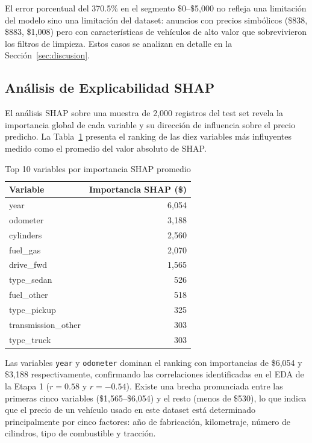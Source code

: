 \documentclass[conference]{IEEEtran}
\begin{document}
El error porcentual del 370.5\% en el segmento \$0–\$5{,}000 no refleja una limitación del modelo sino una limitación del dataset: anuncios con precios simbólicos (\$838, \$883, \$1{,}008) pero con características de vehículos de alto valor que sobrevivieron los filtros de limpieza. Estos casos se analizan en detalle en la Sección~\ref{sec:discusion}.

\subsection{Análisis de Explicabilidad SHAP}
\label{subsec:res_shap}

El análisis SHAP sobre una muestra de 2{,}000 registros del test set revela la importancia global de cada variable y su dirección de influencia sobre el precio predicho. La Tabla~\ref{tab:shap} presenta el ranking de las diez variables más influyentes medido como el promedio del valor absoluto de SHAP.

\begin{table}[H]
    \centering
    \caption{Top 10 variables por importancia SHAP promedio}
    \label{tab:shap}
    \begin{tabular}{lr}
        \toprule
        \textbf{Variable} & \textbf{Importancia SHAP (\$)} \\
        \midrule
        year              & 6{,}054 \\
        odometer          & 3{,}188 \\
        cylinders         & 2{,}560 \\
        fuel\_gas         & 2{,}070 \\
        drive\_fwd        & 1{,}565 \\
        type\_sedan       & 526     \\
        fuel\_other       & 518     \\
        type\_pickup      & 325     \\
        transmission\_other & 303   \\
        type\_truck       & 303     \\
        \bottomrule
    \end{tabular}
\end{table}

Las variables \texttt{year} y \texttt{odometer} dominan el ranking con importancias de \$6{,}054 y \$3{,}188 respectivamente, confirmando las correlaciones identificadas en el EDA de la Etapa 1 ($r{=}0.58$ y $r{=}{-}0.54$). Existe una brecha pronunciada entre las primeras cinco variables (\$1{,}565–\$6{,}054) y el resto (menos de \$530), lo que indica que el precio de un vehículo usado en este dataset está determinado principalmente por cinco factores: año de fabricación, kilometraje, número de cilindros, tipo de combustible y tracción.
\end{document}
